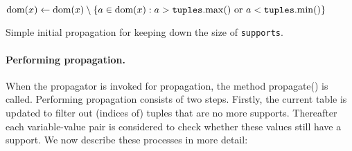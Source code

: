\documentclass[a4paper,11pt]{article}
\newcommand{\Dom}[1]{\text{dom}({#1})}
\newcommand{\Scp}{\texttt{scp}}
\newcommand{\Supports}{\texttt{supports}}
\newcommand{\FOREACH}[1]{\WHILE{{#1} \textbf{do}}}
\newcommand{\ENDFOREACH}{\ENDWHILE}
\newcommand{\function}[1]{\mathrm{#1}}
\begin{document}
\begin{algorithm}[h]
  \begin{algorithmic}[1]  %
    \FOREACH{$x \in \Scp$} %
        \STATE $\Dom{x} \leftarrow \Dom{x} \setminus  
        \Set{a \in \Dom{x} : a > \texttt{tuples}.\function{max}()
          ~\text{or}~a < \texttt{tuples}.\function{min}()}$
      \ENDFOREACH
  \end{algorithmic}
  \caption{Simple initial propagation for keeping down the size of \Supports.}
  \label{algo:initial-propagation}
\end{algorithm}

\paragraph{Performing propagation.}
When the propagator is invoked for propagation, the method propagate() is called.
Performing propagation consists of two steps. Firstly, the current table is
updated to filter out (indices of) tuples that are no more supports. Thereafter
each variable-value pair is considered to check whether these values still have
a support. We now describe these processes in more detail:
\end{document}
